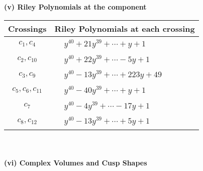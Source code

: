 \documentclass[1p]{elsarticle_modified}
\theoremstyle{definition}
\begin{document}
\newpage\renewcommand{\arraystretch}{1}
\flushleft \textbf{(v) Riley Polynomials at the component}\newline \\
\begin{tabular}{m{50pt}|m{274pt}}
Crossings & \hspace{64pt}Riley Polynomials at each crossing \\
\hline $$\begin{aligned}c_{1},c_{4}\end{aligned}$$&$\begin{aligned}
&y^{40}+21 y^{39}+\cdots+y+1
\end{aligned}$\\
\hline $$\begin{aligned}c_{2},c_{10}\end{aligned}$$&$\begin{aligned}
&y^{40}+22 y^{39}+\cdots-5 y+1
\end{aligned}$\\
\hline $$\begin{aligned}c_{3},c_{9}\end{aligned}$$&$\begin{aligned}
&y^{40}-13 y^{39}+\cdots+223 y+49
\end{aligned}$\\
\hline $$\begin{aligned}c_{5},c_{6},c_{11}\end{aligned}$$&$\begin{aligned}
&y^{40}-40 y^{39}+\cdots+y+1
\end{aligned}$\\
\hline $$\begin{aligned}c_{7}\end{aligned}$$&$\begin{aligned}
&y^{40}-4 y^{39}+\cdots-17 y+1
\end{aligned}$\\
\hline $$\begin{aligned}c_{8},c_{12}\end{aligned}$$&$\begin{aligned}
&y^{40}-13 y^{39}+\cdots+5 y+1
\end{aligned}$\\
\hline
\end{tabular}\\~\\
\newpage\flushleft \textbf{(vi) Complex Volumes and Cusp Shapes}
\end{document}
